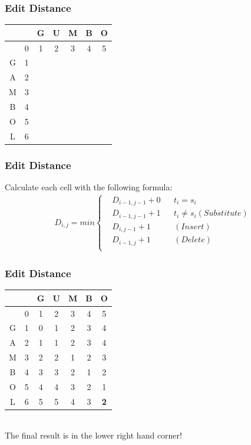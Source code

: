 \begin{frame}[fragile]
\frametitle{Edit Distance}
\begin{tabular}{|c|c|c|c|c|c|c|}
\hline
 & & G & U & M & B & O\\
\hline
 & 0 & 1 & 2 & 3 & 4 & 5\\
\hline
G & 1 & & & & &\\
\hline
A & 2 & & & & &\\
\hline
M & 3 & & & & &\\
\hline
B & 4 & & & & &\\
\hline
O & 5 & & & & &\\
\hline
L & 6 & & & & &\\
\hline
\end{tabular}
\end{frame}

\begin{frame}[fragile]
\frametitle{Edit Distance}
Calculate each cell with the following formula:
\begin{align}
D_{i,j}= min \left\{
\begin{aligned} & D_{i-1,j-1} + 0 & & t_i = s_i\\
& D_{i-1,j-1} + 1 & & t_i \neq s_i (Substitute)\\
& D_{i,j-1} + 1 & & (Insert)\\
& D_{i-1,j} + 1 & & (Delete)\\
\end{aligned}\right.
\end{align}
\end{frame}

\begin{frame}[fragile]
\frametitle{Edit Distance}
\begin{tabular}{|c|c|c|c|c|c|c|}
\hline
 & & G & U & M & B & O\\
\hline
 & 0 & 1 & 2 & 3 & 4 & 5\\
\hline
G & 1 & 0 & 1 & 2 & 3 & 4\\
\hline
A & 2 & 1 & 1 & 2 & 3 & 4\\
\hline
M & 3 & 2 & 2 & 1 & 2 & 3\\
\hline
B & 4 & 3 & 3 & 2 & 1 & 2\\
\hline
O & 5 & 4 & 4 & 3 & 2 & 1\\
\hline
L & 6 & 5 & 5 & 4 & 3 & {\bf 2}\\
\hline
\end{tabular}\\
\vspace{3mm}
The final result is in the lower right hand corner!
\end{frame}

